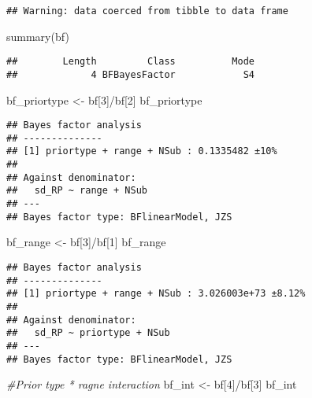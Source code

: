 \documentclass[
]{article}
\newenvironment{Shaded}{\begin{snugshade}}{\end{snugshade}}
\newcommand{\CommentTok}[1]{\textcolor[rgb]{0.56,0.35,0.01}{\textit{#1}}}
\newcommand{\DecValTok}[1]{\textcolor[rgb]{0.00,0.00,0.81}{#1}}
\newcommand{\FunctionTok}[1]{\textcolor[rgb]{0.00,0.00,0.00}{#1}}
\newcommand{\NormalTok}[1]{#1}
\newcommand{\OtherTok}[1]{\textcolor[rgb]{0.56,0.35,0.01}{#1}}
\newcommand{\SpecialCharTok}[1]{\textcolor[rgb]{0.00,0.00,0.00}{#1}}
\begin{document}
\begin{verbatim}
## Warning: data coerced from tibble to data frame
\end{verbatim}

\begin{Shaded}
\begin{Highlighting}[]
\FunctionTok{summary}\NormalTok{(bf)}
\end{Highlighting}
\end{Shaded}

\begin{verbatim}
##        Length         Class          Mode 
##             4 BFBayesFactor            S4
\end{verbatim}

\begin{Shaded}
\begin{Highlighting}[]
\NormalTok{ bf\_priortype }\OtherTok{\textless{}{-}}\NormalTok{ bf[}\DecValTok{3}\NormalTok{]}\SpecialCharTok{/}\NormalTok{bf[}\DecValTok{2}\NormalTok{]}
\NormalTok{ bf\_priortype}
\end{Highlighting}
\end{Shaded}

\begin{verbatim}
## Bayes factor analysis
## --------------
## [1] priortype + range + NSub : 0.1335482 ±10%
## 
## Against denominator:
##   sd_RP ~ range + NSub 
## ---
## Bayes factor type: BFlinearModel, JZS
\end{verbatim}

\begin{Shaded}
\begin{Highlighting}[]
\NormalTok{bf\_range }\OtherTok{\textless{}{-}}\NormalTok{ bf[}\DecValTok{3}\NormalTok{]}\SpecialCharTok{/}\NormalTok{bf[}\DecValTok{1}\NormalTok{]}
\NormalTok{bf\_range}
\end{Highlighting}
\end{Shaded}

\begin{verbatim}
## Bayes factor analysis
## --------------
## [1] priortype + range + NSub : 3.026003e+73 ±8.12%
## 
## Against denominator:
##   sd_RP ~ priortype + NSub 
## ---
## Bayes factor type: BFlinearModel, JZS
\end{verbatim}

\begin{Shaded}
\begin{Highlighting}[]
\CommentTok{\#Prior type * ragne interaction }
\NormalTok{bf\_int }\OtherTok{\textless{}{-}}\NormalTok{ bf[}\DecValTok{4}\NormalTok{]}\SpecialCharTok{/}\NormalTok{bf[}\DecValTok{3}\NormalTok{] }
\NormalTok{bf\_int}
\end{Highlighting}
\end{Shaded}
\end{document}
